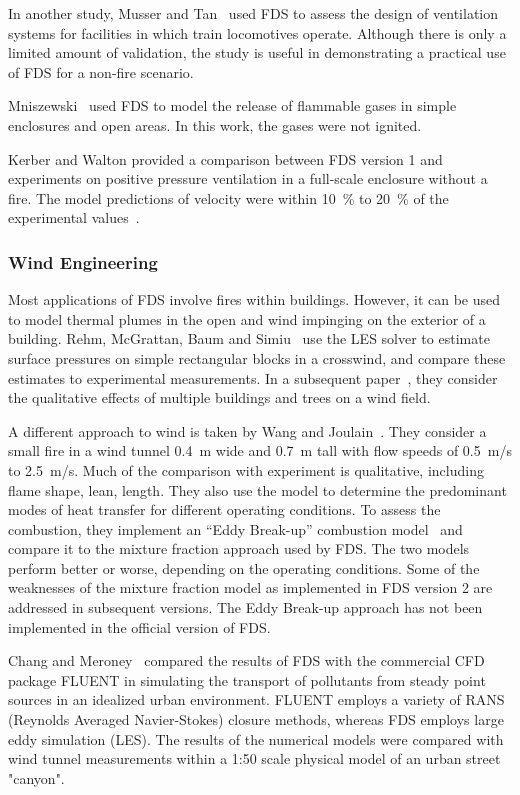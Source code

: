 In another  study, Musser and  Tan~\cite{Musser:2} used FDS  to assess the  design  of ventilation  systems  for  facilities  in which  train
locomotives  operate.  Although there  is  only  a  limited amount  of validation, the  study is useful  in demonstrating a practical  use of FDS for
a non-fire scenario.

Mniszewski~\cite{Mniszewski:1}  used  FDS  to  model  the  release  of flammable gases in simple enclosures and open areas. In this work, the gases
were not ignited.

Kerber  and Walton  provided a  comparison between  FDS version  1 and experiments on positive pressure ventilation in a full-scale enclosure without
a fire.   The model predictions of velocity  were within 10~\% to 20~\% of the experimental values~\cite{Kerber:1}.


\subsubsection{Wind Engineering}

Most applications  of FDS involve fires within  buildings. However, it can be used to model thermal  plumes in the open and wind impinging on the
exterior   of   a   building.    Rehm,   McGrattan,   Baum   and Simiu~\cite{LES:4} use the LES solver to estimate surface pressures on simple
rectangular blocks in  a crosswind, and compare these estimates to experimental measurements.  In a subsequent paper~\cite{Rehm:WS02}, they consider
the qualitative  effects of multiple buildings and trees on a wind field.

A   different    approach   to   wind    is   taken   by    Wang   and Joulain~\cite{Wang:IAFSS2002}. They  consider a  small fire in  a wind tunnel
0.4~m wide  and  0.7~m tall  with  flow speeds  of 0.5~m/s  to 2.5~m/s.  Much  of  the  comparison with  experiment  is  qualitative, including
flame shape,  lean,  length.  They also  use  the model  to determine  the  predominant  modes  of  heat  transfer  for  different operating
conditions. To  assess  the combustion,  they implement  an ``Eddy Break-up''  combustion model~\cite{Magnussen:1} and  compare it to the mixture
fraction approach used by FDS.  The two models perform better or  worse, depending on  the operating conditions. Some  of the weaknesses of the
mixture fraction model as implemented in FDS version 2 are addressed in subsequent versions. The Eddy Break-up approach has not been implemented in
the official version of FDS.

Chang and Meroney~\cite{ChangJWE2003} compared the results of FDS with the  commercial CFD  package  FLUENT in  simulating  the transport  of
pollutants   from  steady   point  sources   in  an   idealized  urban environment.  FLUENT  employs a  variety  of  RANS (Reynolds  Averaged
Navier-Stokes)  closure  methods,   whereas  FDS  employs  large  eddy simulation (LES).   The results of the numerical  models were compared with
wind tunnel measurements within a 1:50 scale physical model of an urban street "canyon".


